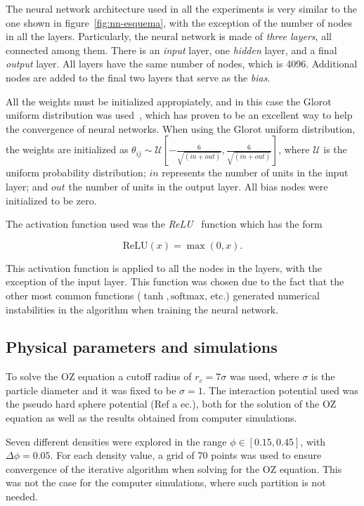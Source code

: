The neural network architecture used in all the experiments is very similar to the one
shown in figure~\ref{fig:nn-esquema}, with the exception of the number of nodes in all the
layers.
Particularly, the neural network is made of \emph{three layers}, all connected among them.
There is an \emph{input} layer, one \emph{hidden} layer, and a final \emph{output} layer.
All layers have the same number of nodes, which is 4096. Additional nodes are added to the
final two layers that serve as the \emph{bias}.

All the weights must be initialized appropiately, and in this case the Glorot uniform
distribution was used~\cite{glorotUnderstandingDifficultyTraining2010}, which has proven
to be an excellent way to help the convergence of neural networks.
When using the Glorot uniform distribution, the weights are initialized as
$
\theta_{ij} \sim \mathcal{U} \left[ -\frac{6}{\sqrt{(in + out)}},
\frac{6}{\sqrt{(in + out)}} \right]
$,
where $\mathcal{U}$ is the uniform probability distribution;
$in$ represents the number of units in the input layer; and $out$ the number of
units in the output layer. All bias nodes were initialized to be zero.

The activation function used was the \emph{ReLU}~\cite{glorotDeepSparseRectifier2011}
function which has the form

\begin{equation*}
    \text{ReLU}(x) = \max{(0, x)} .
\end{equation*}

This activation function is applied to all the nodes in the layers, with the exception
of the input layer. This function was chosen due to the fact that the other most common
functions ($\tanh, \text{softmax}$, etc.) generated numerical instabilities in the
algorithm when training the neural network.

\subsection{Physical parameters and simulations}

To solve the OZ equation a cutoff radius of $r_c=7\sigma$ was used, where $\sigma$ is the
particle diameter and it was fixed to be $\sigma=1$.
The interaction potential used was the pseudo hard sphere potential (Ref a ec.), both
for the solution of the OZ equation as well as the results obtained from computer simulations.

Seven different densities were explored in the range $\phi \in [\num{0.15}, \num{0.45}]$, 
with $\Delta \phi = \num{0.05}$.
For each density value, a grid of 70 points was used to ensure convergence of the iterative
algorithm when solving for the OZ equation. This was not the case for the computer 
simulations, where such partition is not needed.

